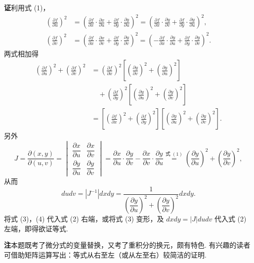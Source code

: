\documentclass[UTF8,12pt,a4paper,fontset=fandol]{ctexart}
\begin{document}
\noindent\textbf{证}\quad 利用式 (1)，
\[
\begin{aligned}
\left(\frac{\partial f}{\partial u}\right)^2
&=\left(\frac{\partial f}{\partial x}\cdot\frac{\partial x}{\partial u}
+\frac{\partial f}{\partial y}\cdot\frac{\partial y}{\partial u}\right)^2
=\left(\frac{\partial f}{\partial x}\cdot\frac{\partial y}{\partial v}
+\frac{\partial f}{\partial y}\cdot\frac{\partial y}{\partial u}\right)^2,\\
\left(\frac{\partial f}{\partial v}\right)^2
&=\left(\frac{\partial f}{\partial x}\cdot\frac{\partial x}{\partial v}
+\frac{\partial f}{\partial y}\cdot\frac{\partial y}{\partial v}\right)^2
=\left(-\frac{\partial f}{\partial x}\cdot\frac{\partial y}{\partial u}
+\frac{\partial f}{\partial y}\cdot\frac{\partial y}{\partial v}\right)^2.
\end{aligned}
\]
两式相加得
\[
\begin{aligned}
\left(\frac{\partial f}{\partial u}\right)^2+
\left(\frac{\partial f}{\partial v}\right)^2
&=\left(\frac{\partial f}{\partial x}\right)^2
\left[\left(\frac{\partial y}{\partial v}\right)^2+
\left(\frac{\partial y}{\partial u}\right)^2\right]\\
&\quad+\left(\frac{\partial f}{\partial y}\right)^2
\left[\left(\frac{\partial y}{\partial u}\right)^2+
\left(\frac{\partial y}{\partial v}\right)^2\right]\\
&=\left[\left(\frac{\partial f}{\partial x}\right)^2+
\left(\frac{\partial f}{\partial y}\right)^2\right]
\left[\left(\frac{\partial y}{\partial u}\right)^2+
\left(\frac{\partial y}{\partial v}\right)^2\right].
\end{aligned}
\tag{3}
\]
另外
\[
J=\frac{\partial(x,y)}{\partial(u,v)}
=\begin{vmatrix}
\dfrac{\partial x}{\partial u}&\dfrac{\partial x}{\partial v}\\
\dfrac{\partial y}{\partial u}&\dfrac{\partial y}{\partial v}
\end{vmatrix}
=\frac{\partial x}{\partial u}\cdot\frac{\partial y}{\partial v}
-\frac{\partial x}{\partial v}\cdot\frac{\partial y}{\partial u}
\stackrel{\text{式 }(1)}=
\left(\frac{\partial y}{\partial u}\right)^2+
\left(\frac{\partial y}{\partial v}\right)^2,
\]
从而
\[
dudv=|J^{-1}|dxdy=
\frac1{\left(\dfrac{\partial y}{\partial u}\right)^2+
\left(\dfrac{\partial y}{\partial v}\right)^2}dxdy. \tag{4}
\]
将式 (3)，(4) 代入式 (2) 右端，或将式 (3) 变形，及 $dxdy=|J|dudv$ 代入式 (2) 左端，即得欲证等式.

\noindent\textbf{注}\quad 本题既考了微分式的变量替换，又考了重积分的换元，颇有特色. 有兴趣的读者可借助矩阵运算写出：等式从右至左（或从左至右）较简洁的证明.
\end{document}
